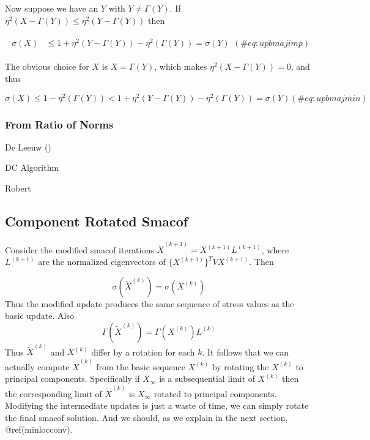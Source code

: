 \documentclass[
  12pt,
  letterpaper,
  DIV=11,
  numbers=noendperiod]{scrreprt}
\theoremstyle{remark}
\begin{document}
Now suppose we have an \(Y\) with \(Y\not=\Gamma(Y)\). If
\(\eta^2(X-\Gamma(Y))\leq\eta^2(Y-\Gamma(Y))\) then

\begin{align}
\begin{split}
\sigma(X)%
&\leq 1+\eta^2(Y-\Gamma(Y))-\eta^2(\Gamma(Y))=\sigma(Y)
\end{split}
(\#eq:upbmajimp)
\end{align}

The obvious choice for \(X\) is \(X=\Gamma(Y)\), which makes
\(\eta^2(X-\Gamma(Y))=0\), and thus

\begin{equation}
\sigma(X)\leq 1-\eta^2(\Gamma(Y))<
1+\eta^2(Y-\Gamma(Y))-\eta^2(\Gamma(Y))=\sigma(Y)
(\#eq:upbmajmin)
\end{equation}

\subsubsection{From Ratio of Norms}\label{from-ratio-of-norms}

De Leeuw ()

DC Algorithm

Robert

\subsection{Component Rotated Smacof}\label{mincomprot}

Consider the modified smacof iterations
\(\tilde X^{(k+1)}=X^{(k+1)}L^{(k+1)}\), where \(L^{(k+1)}\) are the
normalized eigenvectors of \(\{X^{(k+1)}\}^TVX^{(k+1)}\). Then

\[
\sigma(\tilde X^{(k)})=\sigma(X^{(k)})
\] Thus the modified update produces the same sequence of stress values
as the basic update. Also \[
\Gamma(\tilde X^{(k)})=\Gamma(X^{(k)})L^{(k)}
\] Thus \(\tilde X^{(k)}\) and \(X^{(k)}\) differ by a rotation for each
\(k\). It follows that we can actually compute \(\tilde X^{(k)}\) from
the basic sequence \(X^{(k)}\) by rotating the \(X^{(k)}\) to principal
components. Specifically if \(X_\infty\) is a subsequential limit of
\(X^{(k)}\) then the corresponding limit of \(\tilde X^{(k)}\) is
\(X_\infty\) rotated to principal components. Modifying the intermediate
updates is just a waste of time, we can simply rotate the final smacof
solution. And we should, as we explain in the next section,
@ref(minlocconv).
\end{document}
